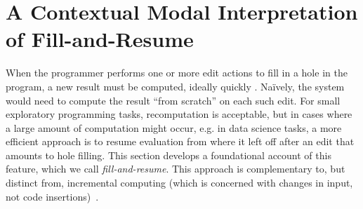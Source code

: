



\newcommand{\commutativitySec}{A Contextual Modal Interpretation of Fill-and-Resume}
\section{\protect\commutativitySec}
\label{sec:resumption}


When the programmer performs one or more edit actions to fill in a hole in the program, a new result must be computed, ideally quickly \cite{DBLP:conf/icse/Tanimoto13,DBLP:journals/vlc/Tanimoto90}. Na\"ively, the system would need to compute the result ``from scratch'' on each such edit. For small exploratory programming tasks, recomputation is acceptable, but in cases where a large amount of computation might occur, e.g. in data science tasks, a more efficient approach is to resume evaluation from where it left off after an edit that amounts to hole filling. This section develops a foundational account of this feature, which we call \emph{fill-and-resume}. This approach is complementary to, but distinct from, incremental computing (which is concerned with changes in input, not code insertions)~\cite{Hammer2014}.


